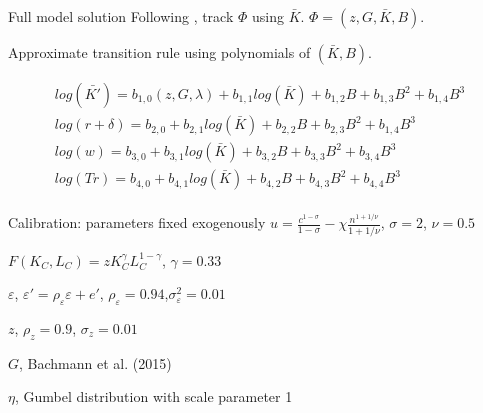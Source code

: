\documentclass[svgnames]{beamer}
\begin{document}
\begin{frame}{Full model solution}
Following \citet{krusell_income_1998}, track $\Phi$ using $\bar{K}$. $\Phi = (z,G,\bar{K},B)$.

Approximate transition rule using polynomials of $(\bar{K},B)$.

$$
\begin{aligned}
log(\bar{K'}) = b_{1,0}(z,G,\lambda) + b_{1,1}log(\bar{K}) + b_{1,2}B + b_{1,3}B^2 + b_{1,4}B^3 \\ 
log(r+\delta) = b_{2,0} + b_{2,1}log(\bar{K}) + b_{2,2}B + b_{2,3}B^2 + b_{1,4}B^3 \\ 
log(w) = b_{3,0} + b_{3,1}log(\bar{K}) + b_{3,2}B + b_{3,3}B^2 + b_{3,4}B^3 \\ 
log(Tr) = b_{4,0} + b_{4,1}log(\bar{K}) + b_{4,2}B + b_{4,3}B^2 + b_{4,4}B^3 \\ 
\end{aligned}
$$
\end{frame}

\begin{frame}{Calibration: parameters fixed exogenously}
$u=\frac{c^{1-\sigma}}{1-\sigma}-\chi \frac{n^{1+1/ \nu}}{1+1 / \nu}$, $\sigma=2$, $\nu=0.5$

$F(K_C,L_C) = zK_C^{\gamma}L_C^{1-\gamma}$, $\gamma=0.33$

$\varepsilon$, $\varepsilon'=\rho_{\varepsilon}\varepsilon + e'$, $\rho_{\varepsilon}=0.94$,$\sigma^2_{\varepsilon}=0.01$

$z$, $\rho_z=0.9$, $\sigma_z=0.01$

$G$, Bachmann et al. (2015)

$\eta$, Gumbel distribution with scale parameter 1
\end{frame}
\end{document}
